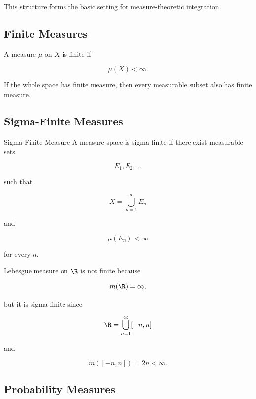 This structure forms the basic setting for measure-theoretic integration.

\subsection{Finite Measures}
\label{subsec:finite-measures}

A measure \(\mu\) on \(X\) is finite if

\[
\boxed{
\mu(X)<\infty.
}
\]

If the whole space has finite measure, then every measurable subset also
has finite measure.

\subsection{Sigma-Finite Measures}
\label{subsec:sigma-finite-measures}

\begin{definitionbox}{Sigma-Finite Measure}
A measure space is sigma-finite if there exist measurable sets

\[
E_1,E_2,\ldots
\]

such that

\[
\boxed{
X=
\bigcup_{n=1}^{\infty}E_n
}
\]

and

\[
\boxed{
\mu(E_n)<\infty
}
\]

for every \(n\).
\end{definitionbox}

Lebesgue measure on \(\R\) is not finite because

\[
m(\R)=\infty,
\]

but it is sigma-finite since

\[
\R
=
\bigcup_{n=1}^{\infty}[-n,n]
\]

and

\[
m([-n,n])=2n<\infty.
\]

\subsection{Probability Measures}
\label{subsec:probability-measures}

